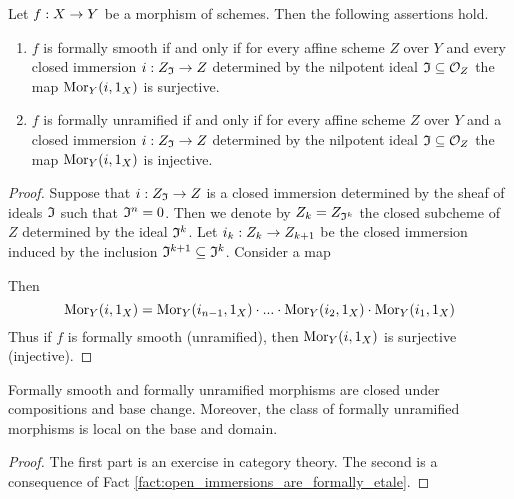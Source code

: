 \begin{fact}\label{fact:extension_of_formally_smooth_and_unramified_for_nilpotent_ideals}
Let $f:X\rightarrow Y$ be a morphism of schemes. Then the following assertions hold.
\begin{enumerate}[label=\emph{\textbf{(\arabic*)}}, leftmargin=3.0em]
\item $f$ is formally smooth if and only if for every affine scheme $Z$ over $Y$ and every closed immersion $i:Z_{\mathfrak{I}}\rightarrow Z$ determined by the nilpotent ideal $\mathfrak{I}\subseteq {\mathcal O}_Z$ the map $\mathrm{Mor}_Y(i,1_X)$ is surjective.  
\item $f$ is formally unramified if and only if for every affine scheme $Z$ over $Y$ and a closed immersion $i:Z_{\mathfrak{I}}\rightarrow Z$ determined by the nilpotent ideal $\mathfrak{I}\subseteq {\mathcal O}_Z$ the map $\mathrm{Mor}_Y(i,1_X)$ is injective.
\end{enumerate} 
\end{fact}
\begin{proof}
Suppose that $i:Z_{\mathfrak{I}}\rightarrow Z$ is a closed immersion determined by the sheaf of ideals $\mathfrak{I}$ such that $\mathfrak{I}^n=0$. Then we denote by $Z_k = Z_{\mathfrak{I}^k}$ the closed subcheme of $Z$ determined by the ideal $\mathfrak{I}^k$. Let $i_k:Z_k\rightarrow Z_{k+1}$ be the closed immersion induced by the inclusion $\mathfrak{I}^{k+1} \subseteq \mathfrak{I}^k$. Consider a map
\begin{center}
\end{center}
Then
$$\mathrm{Mor}_Y(i,1_X) = \mathrm{Mor}_Y(i_{n-1},1_X)\cdot ...\cdot \mathrm{Mor}_Y(i_{2},1_X)\cdot \mathrm{Mor}_Y(i_{1},1_X)$$
Thus if $f$ is formally smooth (unramified), then $\mathrm{Mor}_Y(i,1_X)$ is surjective (injective).
\end{proof}

\begin{proposition}
Formally smooth and formally unramified morphisms are closed under compositions and base change. Moreover, the class of formally unramified morphisms is local on the base and domain.
\end{proposition}
\begin{proof}
The first part is an exercise in category theory. The second is a consequence of Fact \ref{fact:open_immersions_are_formally_etale}.
\end{proof}

